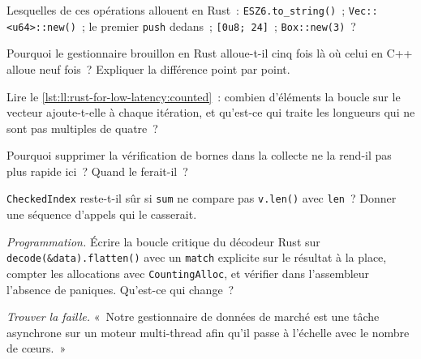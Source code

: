 \begin{exercise}[$\star$]\label{exo:ll:rust-for-low-latency:2}
Lesquelles de ces opérations allouent en Rust~: \texttt{\textquotedbl{}ESZ6\textquotedbl{}.to\_string()}~; \texttt{Vec::<u64>::new()}~; le premier
\texttt{push} dedans~; \texttt{[0u8; 24]}~; \texttt{Box::new(3)}~?
\end{exercise}

\begin{exercise}[$\star$]\label{exo:ll:rust-for-low-latency:3}
Pourquoi le gestionnaire brouillon en Rust alloue-t-il cinq fois là où celui en C++ alloue neuf fois~? Expliquer la différence
point par point.
\end{exercise}

\begin{exercise}[$\star\star$]\label{exo:ll:rust-for-low-latency:4}
Lire le \cref{lst:ll:rust-for-low-latency:counted}~: combien d'éléments la boucle sur le vecteur ajoute-t-elle à chaque itération, et qu'est-ce qui traite les
longueurs qui ne sont pas multiples de quatre~?
\end{exercise}

\begin{exercise}[$\star\star$]\label{exo:ll:rust-for-low-latency:5}
Pourquoi supprimer la vérification de bornes dans la collecte ne la rend-il pas plus rapide ici~? Quand le ferait-il~?
\end{exercise}

\begin{exercise}[$\star\star$]\label{exo:ll:rust-for-low-latency:6}
\texttt{CheckedIndex} reste-t-il sûr si \texttt{sum} ne compare pas \texttt{v.len()} avec \texttt{len}~? Donner une
séquence d'appels qui le casserait.
\end{exercise}

\begin{exercise}[$\star\star\star$]\label{exo:ll:rust-for-low-latency:7}
\emph{Programmation.} Écrire la boucle critique du décodeur Rust sur \texttt{decode(\&data).flatten()} avec un \texttt{match} explicite sur
le résultat à la place, compter les allocations avec \texttt{CountingAlloc}, et vérifier dans l'assembleur l'absence de paniques. Qu'est-ce qui change~?
\end{exercise}

\begin{exercise}[$\star\star\star$]\label{exo:ll:rust-for-low-latency:8}
\emph{Trouver la faille.} «~Notre gestionnaire de données de marché est une tâche asynchrone sur un moteur multi-thread afin qu'il passe à l'échelle avec le
nombre de cœurs.~»
\end{exercise}

